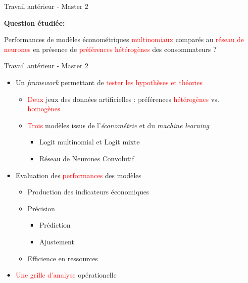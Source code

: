 \documentclass[11pt,ignorenonframetext,]{beamer}
\providecommand{\tightlist}{%
  \setlength{\itemsep}{0pt}\setlength{\parskip}{0pt}}
\begin{document}
\begin{frame}{Travail antérieur - Master 2}
\protect\hypertarget{travail-anterieur---master-2}{}

\textbf{Question étudiée:}

\begin{center}
Performances de modèles économétriques \textcolor{red}{multinomiaux} comparés au \textcolor{red}{réseau de neurones} en présence de \textcolor{red}{préférences hétérogènes} des consommateurs ?
\end{center}

\end{frame}

\begin{frame}{Travail antérieur - Master 2}
\protect\hypertarget{travail-anterieur---master-2-1}{}

\begin{itemize}
\tightlist
\item
  Un \emph{framework} permettant de
  \textcolor{red}{tester les hypothèses et théories}

  \begin{itemize}
  \tightlist
  \item
    \textcolor{red}{Deux} jeux des données artificielles :
    \newline préférences \textcolor{red}{hétérogènes} vs.
    \textcolor{red}{homogènes}
  \item
    \textcolor{red}{Trois} modèles issus de l'\emph{économétrie} et du
    \emph{machine learning}

    \begin{itemize}
    \tightlist
    \item
      Logit multinomial et Logit mixte
    \item
      Réseau de Neurones Convolutif
    \end{itemize}
  \end{itemize}
\item
  Evaluation des \textcolor{red}{performances} des modèles

  \begin{itemize}
  \tightlist
  \item
    Production des indicateurs économiques
  \item
    Précision

    \begin{itemize}
    \tightlist
    \item
      Prédiction
    \item
      Ajustement
    \end{itemize}
  \item
    Efficience en ressources
  \end{itemize}
\item
  \textcolor{red}{Une grille d'analyse} opérationelle
\end{itemize}

\end{frame}
\end{document}
